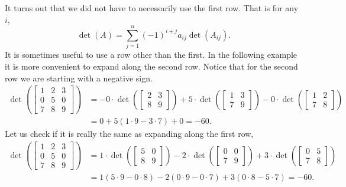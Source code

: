 It turns out that we did not have to necessarily use the first row.  That is
for any $i$,
\begin{equation*}
\det (A)
=
\sum_{j=1}^n
{(-1)}^{i+j}
a_{ij} \det (A_{ij}) .
\end{equation*}
It is sometimes useful to use a row other than the first.  In the following
example it is more convenient to expand along the second row.  Notice that for the
second row we are starting with a negative sign.
\begin{equation*}
\begin{split}
\det \left(
\begin{bmatrix}
1 & 2 & 3 \\
0 & 5 & 0 \\
7 & 8 & 9
\end{bmatrix}
\right)
& =
- 0 \cdot
\det \left(
\begin{bmatrix}
2 & 3 \\
8 & 9
\end{bmatrix}
\right)
+
5 \cdot
\det \left(
\begin{bmatrix}
1 & 3 \\
7 & 9
\end{bmatrix}
\right)
-
0 \cdot
\det \left(
\begin{bmatrix}
1 & 2 \\
7 & 8
\end{bmatrix}
\right) \\
& =
0
+
5 (1 \cdot 9 - 3 \cdot 7)
+
0
= -60 .
\end{split}
\end{equation*}
Let us check if it is really the same as expanding along the first row,
\begin{equation*}
\begin{split}
\det \left(
\begin{bmatrix}
1 & 2 & 3 \\
0 & 5 & 0 \\
7 & 8 & 9
\end{bmatrix}
\right)
& =
1 \cdot
\det \left(
\begin{bmatrix}
5 & 0 \\
8 & 9
\end{bmatrix}
\right)
-
2 \cdot
\det \left(
\begin{bmatrix}
0 & 0 \\
7 & 9
\end{bmatrix}
\right)
+
3 \cdot
\det \left(
\begin{bmatrix}
0 & 5 \\
7 & 8
\end{bmatrix}
\right) \\
& =
1 (5 \cdot 9 - 0 \cdot 8)
-
2 (0 \cdot 9 - 0 \cdot 7)
+
3 (0 \cdot 8 - 5 \cdot 7)
= -60 .
\end{split}
\end{equation*}



